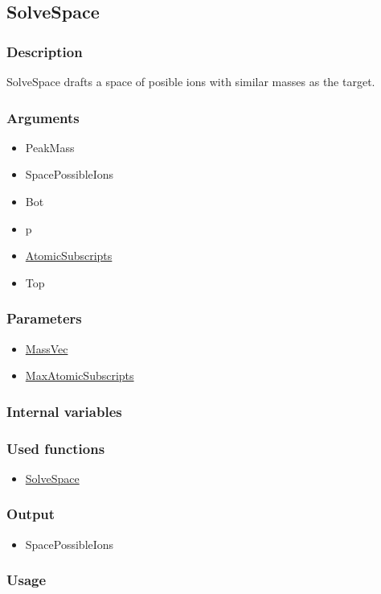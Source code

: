 \subsection{SolveSpace}\label{SolveSpace}
\subsubsection{Description}
SolveSpace drafts a space of posible ions with similar masses as the target.
\subsubsection{Arguments}
\begin{itemize}
\item PeakMass
\item SpacePossibleIons
\item Bot
\item p
\item \hyperref[AtomicSubscripts]{AtomicSubscripts}
\item Top
\end{itemize}
\subsubsection{Parameters}
\begin{itemize}
\item \hyperref[MassVec]{MassVec}
\item \hyperref[MaxAtomicSubscripts]{MaxAtomicSubscripts}
\end{itemize}
\subsubsection{Internal variables}
\subsubsection{Used functions}
\begin{itemize}
\item \hyperref[SolveSpace]{SolveSpace}
\end{itemize}
\subsubsection{Output}
\begin{itemize}
\item SpacePossibleIons
\end{itemize}
\subsubsection{Usage}


